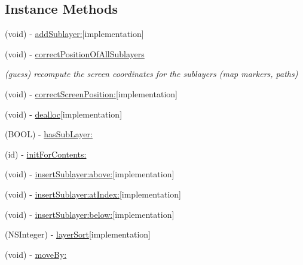 \subsection*{Instance Methods}
\begin{DoxyCompactItemize}
\item 
(void) -\/ \hyperlink{interface_r_m_layer_collection_a00588bd2c9488a450c8327b3de85bc88}{add\-Sublayer\-:}{\ttfamily  \mbox{[}implementation\mbox{]}}
\item 
(void) -\/ \hyperlink{interface_r_m_layer_collection_ab76d0a4f31f1617628edbdb6fe17b41e}{correct\-Position\-Of\-All\-Sublayers}
\begin{DoxyCompactList}\small\item\em (guess) recompute the screen coordinates for the sublayers (map markers, paths) \end{DoxyCompactList}\item 
(void) -\/ \hyperlink{interface_r_m_layer_collection_a9fdcb7e63266c915fbac013552c74da2}{correct\-Screen\-Position\-:}{\ttfamily  \mbox{[}implementation\mbox{]}}
\item 
(void) -\/ \hyperlink{interface_r_m_layer_collection_abc469c537574baa857ae981d193787ea}{dealloc}{\ttfamily  \mbox{[}implementation\mbox{]}}
\item 
(B\-O\-O\-L) -\/ \hyperlink{interface_r_m_layer_collection_a295705bf0ba820773f8d7a2ea002c670}{has\-Sub\-Layer\-:}
\item 
(id) -\/ \hyperlink{interface_r_m_layer_collection_a7691c224d9d64c8ed628187fb1b3b995}{init\-For\-Contents\-:}
\item 
(void) -\/ \hyperlink{interface_r_m_layer_collection_acc9f963b57d611df71a9604d208bb169}{insert\-Sublayer\-:above\-:}{\ttfamily  \mbox{[}implementation\mbox{]}}
\item 
(void) -\/ \hyperlink{interface_r_m_layer_collection_a2668330bd243651e532c232d932e0be1}{insert\-Sublayer\-:at\-Index\-:}{\ttfamily  \mbox{[}implementation\mbox{]}}
\item 
(void) -\/ \hyperlink{interface_r_m_layer_collection_a035dd534f0402568f3a8dcde1798710f}{insert\-Sublayer\-:below\-:}{\ttfamily  \mbox{[}implementation\mbox{]}}
\item 
(N\-S\-Integer) -\/ \hyperlink{interface_r_m_layer_collection_a302ebeb3ef7a162238e5f4060ca8f685}{layer\-Sort}{\ttfamily  \mbox{[}implementation\mbox{]}}
\item 
(void) -\/ \hyperlink{interface_r_m_layer_collection_aea4e071b3b6841f2892ff7dde0f737e6}{move\-By\-:}
\item 

\end{DoxyCompactItemize}
